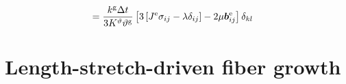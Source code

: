 \documentclass[10pt,letterpaper,oneside]{report}
\newcommand{\ten}[1]{\mbox{\boldmath $#1$}{}}
\newcommand{\scas}[1]{\mbox{{\scriptsize{${\rm{#1}}$}}}{}}
\begin{document}
\begin{align}
={}& \frac{k^{\scas{g}} \Delta t}{3 K^\vartheta \vartheta^{\scas{g}}} \left[ 3 \left[ J^{\scas{e}} \sigma_{ij} - \lambda \delta_{ij} \right] 
- 2 \mu \ten{b}^{\scas{e}}_{ij} \right] \delta_{kl} 
\end{align}


\section{Length-stretch-driven fiber growth}
\end{document}
